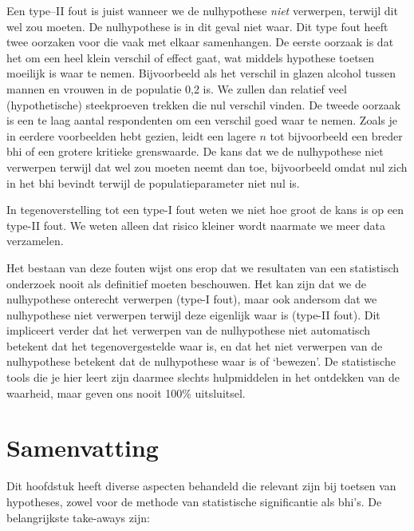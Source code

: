 \documentclass[
  letterpaper,
  DIV=11,
  numbers=noendperiod]{scrreprt}
\begin{document}
Een type--II fout is juist wanneer we de nulhypothese \emph{niet}
verwerpen, terwijl dit wel zou moeten. De nulhypothese is in dit geval
niet waar. Dit type fout heeft twee oorzaken voor die vaak met elkaar
samenhangen. De eerste oorzaak is dat het om een heel klein verschil of
effect gaat, wat middels hypothese toetsen moeilijk is waar te nemen.
Bijvoorbeeld als het verschil in glazen alcohol tussen mannen en vrouwen
in de populatie 0,2 is. We zullen dan relatief veel (hypothetische)
steekproeven trekken die nul verschil vinden. De tweede oorzaak is een
te laag aantal respondenten om een verschil goed waar te nemen. Zoals je
in eerdere voorbeelden hebt gezien, leidt een lagere \(n\) tot
bijvoorbeeld een breder bhi of een grotere kritieke grenswaarde. De kans
dat we de nulhypothese niet verwerpen terwijl dat wel zou moeten neemt
dan toe, bijvoorbeeld omdat nul zich in het bhi bevindt terwijl de
populatieparameter niet nul is.

In tegenoverstelling tot een type-I fout weten we niet hoe groot de kans
is op een type-II fout. We weten alleen dat risico kleiner wordt
naarmate we meer data verzamelen.

Het bestaan van deze fouten wijst ons erop dat we resultaten van een
statistisch onderzoek nooit als definitief moeten beschouwen. Het kan
zijn dat we de nulhypothese onterecht verwerpen (type-I fout), maar ook
andersom dat we nulhypothese niet verwerpen terwijl deze eigenlijk waar
is (type-II fout). Dit impliceert verder dat het verwerpen van de
nulhypothese niet automatisch betekent dat het tegenovergestelde waar
is, en dat het niet verwerpen van de nulhypothese betekent dat de
nulhypothese waar is of `bewezen'. De statistische tools die je hier
leert zijn daarmee slechts hulpmiddelen in het ontdekken van de
waarheid, maar geven ons nooit 100\% uitsluitsel.

\section{Samenvatting}\label{samenvatting-4}

Dit hoofdstuk heeft diverse aspecten behandeld die relevant zijn bij
toetsen van hypotheses, zowel voor de methode van statistische
significantie als bhi's. De belangrijkste take-aways zijn:
\end{document}
